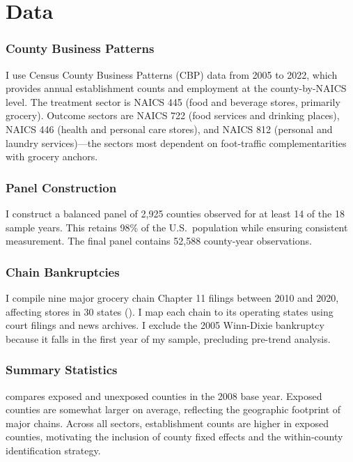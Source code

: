 \documentclass[12pt]{article}
\begin{document}
\section{Data}
\label{sec:data}

\subsubsection*{County Business Patterns} I use Census County Business Patterns (CBP) data from 2005 to 2022, which provides annual establishment counts and employment at the county-by-NAICS level. The treatment sector is NAICS 445 (food and beverage stores, primarily grocery). Outcome sectors are NAICS 722 (food services and drinking places), NAICS 446 (health and personal care stores), and NAICS 812 (personal and laundry services)---the sectors most dependent on foot-traffic complementarities with grocery anchors.

\subsubsection*{Panel Construction} I construct a balanced panel of 2,925 counties observed for at least 14 of the 18 sample years. This retains 98\% of the U.S.\ population while ensuring consistent measurement. The final panel contains 52,588 county-year observations.

\subsubsection*{Chain Bankruptcies} I compile nine major grocery chain Chapter 11 filings between 2010 and 2020, affecting stores in 30 states (). I map each chain to its operating states using court filings and news archives. I exclude the 2005 Winn-Dixie bankruptcy because it falls in the first year of my sample, precluding pre-trend analysis.

\subsubsection*{Summary Statistics}  compares exposed and unexposed counties in the 2008 base year. Exposed counties are somewhat larger on average, reflecting the geographic footprint of major chains. Across all sectors, establishment counts are higher in exposed counties, motivating the inclusion of county fixed effects and the within-county identification strategy.



\end{document}
